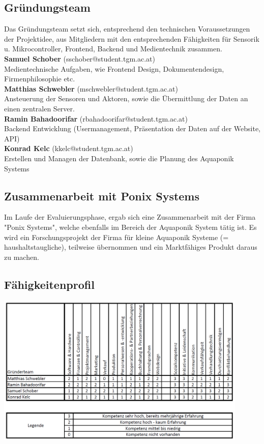 \documentclass[11pt]{article}
\begin{document}
\subsection{Gründungsteam}
Das Gründungsteam setzt sich, entsprechend den technischen Voraussetzungen der Projektidee, aus Mitgliedern mit den entsprechenden Fähigkeiten für Sensorik u. Mikrocontroller, Frontend, Backend und Medientechnik zusammen. \\
\textbf{Samuel Schober} (sschober@student.tgm.ac.at) \\
Medientechnische Aufgaben, wie Frontend Design, Dokumentendesign, Firmenphilosophie etc. \\ 
\textbf{Matthias Schwebler} (mschwebler@student.tgm.ac.at) \\
Ansteuerung der Sensoren und Aktoren, sowie die Übermittlung der Daten an einen zentralen Server. \\
\textbf{Ramin Bahadoorifar} (rbahadoorifar@student.tgm.ac.at) \\
Backend Entwicklung (Usermanagement, Präsentation der Daten auf der Website, API) \\
\textbf{Konrad Kelc} (kkelc@student.tgm.ac.at) \\
Erstellen und Managen der Datenbank, sowie die Planung des Aquaponik Systems \\

\subsection{Zusammenarbeit mit Ponix Systems}
Im Laufe der Evaluierungsphase, ergab sich eine Zusammenarbeit mit der Firma "Ponix Systems", welche ebenfalls im Bereich der Aquaponik System tätig ist. Es wird ein Forschungsprojekt der Firma für kleine Aquaponik Systeme (= haushaltstaugliche), teilweise übernommen und ein Marktfähiges Produkt daraus zu machen. 

\subsection{F\"ahigkeitenprofil}
\begin{center}
	\includegraphics[width=12cm]{faehigkeiten}
\end{center}
\end{document}
